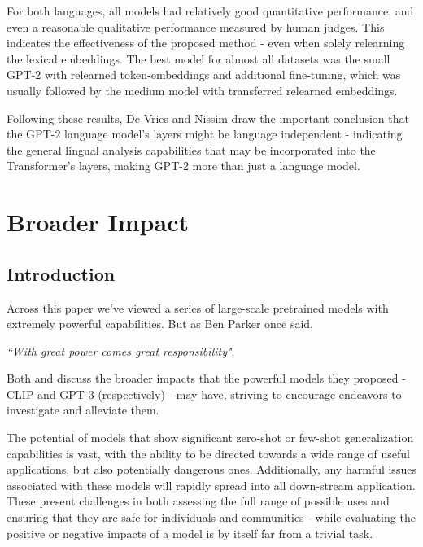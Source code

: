 \documentclass{article}
\begin{document}
\medskip
\noindent
For both languages, all models had relatively good quantitative performance, and even a reasonable qualitative performance measured by human judges. This indicates the effectiveness of the proposed method - even when solely relearning the lexical embeddings. The best model for almost all datasets was the small GPT-2 with relearned token-embeddings and additional fine-tuning, which was usually followed by the medium model with transferred relearned embeddings.

\medskip
\noindent
Following these results, De Vries and Nissim draw the important conclusion that the GPT-2 language model's layers might be language independent - indicating the general lingual analysis capabilities that may be incorporated into the Transformer's layers, making GPT-2 more than just a language model.




\newpage
\section{Broader Impact}
\label{chap:impacts}



\subsection{Introduction}
\label{sec:impacts-intro}

Across this paper we've viewed a series of large-scale pretrained models with extremely powerful capabilities. But as Ben Parker once said,
\begin{center}
    \emph{``With great power comes great responsibility"}.
\end{center}
Both \citet{radford2021clip} and \citet{brown2020gpt3} discuss the broader impacts that the powerful models they proposed - CLIP and GPT-3 (respectively) - may have, striving to encourage endeavors to investigate and alleviate them.

\medskip
\noindent
The potential of models that show significant zero-shot or few-shot generalization capabilities is vast, with the ability to be directed towards a wide range of useful applications, but also potentially dangerous ones. Additionally, any harmful issues associated with these models will rapidly spread into all down-stream application. These present challenges in both assessing the full range of possible uses and ensuring that they are safe for individuals and communities - while evaluating the positive or negative impacts of a model is by itself far from a trivial task.
\end{document}
